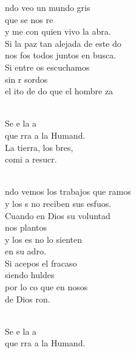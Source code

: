 \documentclass[12pt]{article}
\begin{document}
\begin{multicols*}{2}
\begin{cancion}%
	ndo veo un mundo gris \\
	que se nos re\\
	y me  con quien vivo la abra.\\
	Si la paz tan alejada de este do\\
	nos fos todos juntos en busca.\\
	Si entre os escuchamos \\
	sin r sordos\\
	el ito de do que el hombre za\\\jump\\
	\begin{chorus}%
	Se e la a\\
	que rra a la Humand.\\
	La tierra, los bres,\\
	comi a resucr.\\
	\end{chorus}%
	\jump\\
	ndo vemos los trabajos que ramos\\
	y los s no reciben sus esfuos.\\
Cuando en Dios su voluntad \\
	nos plantos\\
	y los es no lo sienten \\
	en su adro.\\
	Si acepos el fracaso \\
	siendo huldes\\
	por lo co que en nosos \\
	de Dios ron.\\\jump\\
	\begin{chorus}%
	Se e la a\\
	que rra a la Humand.\\

\end{chorus}
\end{cancion}
\end{multicols*}
\end{document}
